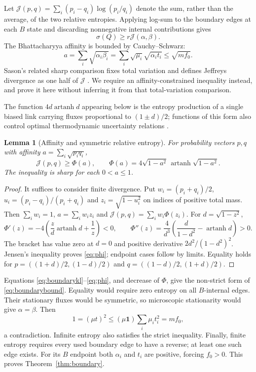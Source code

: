 \documentclass[11pt,a4paper]{article}
\newtheorem{lemma}[theorem]{Lemma}
\theoremstyle{remark}\newtheorem{remark}[theorem]{Remark}
\newcommand{\one}{\mathbf 1}
\newcommand{\atanh}{\operatorname{artanh}}
\newcommand{\J}{\mathcal J}
\begin{document}
Let $\J(p,q)=\sum_i(p_i-q_i)\log(p_i/q_i)$ denote the sum, rather than
the average, of the two relative entropies. Applying log-sum to the boundary
edges at each $B$ state and discarding nonnegative internal contributions gives
\begin{equation}\label{eq:boundarykl}
 \sigma(Q)\geq r\J(\alpha,\beta).
\end{equation}
The Bhattacharyya affinity is bounded by Cauchy--Schwarz:
\begin{equation}\label{eq:affinitycs}
 a=\sum_i\sqrt{\alpha_i\beta_i}
   =\sum_i\sqrt{\mu_i}\sqrt{\alpha_it_i}
   \leq\sqrt{mf_0}.
\end{equation}
Sason's related sharp comparison fixes total variation and defines Jeffreys
divergence as one half of $\J$ \cite{sason}. We require an affinity-constrained
inequality instead, and prove it here without inferring it from that
total-variation comparison.

The function $4d\atanh d$ appearing below is the entropy production of a
single biased link carrying fluxes proportional to $(1\pm d)/2$; functions of
this form also control optimal thermodynamic uncertainty relations
\cite{shiraishi}.

\begin{lemma}[Affinity and symmetric relative entropy]\label{lem:affinity}
For probability vectors $p,q$ with affinity $a=\sum_i\sqrt{p_iq_i}$,
\begin{equation}\label{eq:phi}
 \J(p,q)\geq\Phi(a),\qquad
 \Phi(a)=4\sqrt{1-a^2}\,\atanh\sqrt{1-a^2}.
\end{equation}
The inequality is sharp for each $0<a\leq1$.
\end{lemma}
\begin{proof}
It suffices to consider finite divergence. Put $w_i=(p_i+q_i)/2$,
$u_i=(p_i-q_i)/(p_i+q_i)$ and $z_i=\sqrt{1-u_i^2}$ on indices of positive
total mass. Then $\sum_iw_i=1$, $a=\sum_iw_iz_i$ and
$\J(p,q)=\sum_iw_i\Phi(z_i)$. For $d=\sqrt{1-z^2}$,
\begin{equation}
 \Phi'(z)=-4\left(\frac z d\atanh d+\frac1z\right)<0,
 \qquad
 \Phi''(z)=\frac4{d^3}\left(\frac d{1-d^2}-\atanh d\right)>0.
\end{equation}
The bracket has value zero at $d=0$ and positive derivative
$2d^2/(1-d^2)^2$. Jensen's inequality proves \eqref{eq:phi}; endpoint
cases follow by limits. Equality holds for
$p=((1+d)/2,(1-d)/2)$ and $q=((1-d)/2,(1+d)/2)$.
\end{proof}

Equations \eqref{eq:boundarykl}--\eqref{eq:phi}, and decrease of $\Phi$,
give the non-strict form of \eqref{eq:boundarybound}. Equality would require
zero entropy on all $B$-internal edges. Their stationary fluxes would be
symmetric, so microscopic stationarity would give $\alpha=\beta$. Then
\begin{equation}
 1=(\mu t)^2\leq(\mu\one)\sum_i\mu_it_i^2=mf_0,
\end{equation}
a contradiction. Infinite entropy also satisfies the strict inequality.
Finally, finite entropy requires every used boundary edge to have a reverse;
at least one such edge exists. For its $B$ endpoint both $\alpha_i$ and $t_i$
are positive, forcing $f_0>0$. This proves Theorem~\ref{thm:boundary}.
\end{document}
